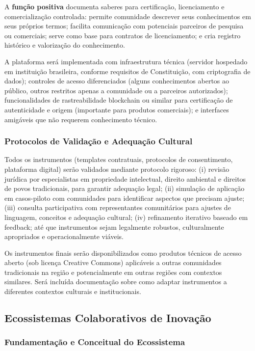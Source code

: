 A \textbf{função positiva} documenta saberes para certificação, licenciamento e comercialização controlada: permite comunidade descrever seus conhecimentos em seus próprios termos; facilita comunicação com potenciais parceiros de pesquisa ou comerciais; serve como base para contratos de licenciamento; e cria registro histórico e valorização do conhecimento.

A plataforma será implementada com infraestrutura técnica (servidor hospedado em instituição brasileira, conforme requisitos de Constituição, com criptografia de dados); controles de acesso diferenciados (alguns conhecimentos abertos ao público, outros restritos apenas a comunidade ou a parceiros autorizados); funcionalidades de rastreabilidade blockchain ou similar para certificação de autenticidade e origem (importante para produtos comerciais); e interfaces amigáveis que não requerem conhecimento técnico.

\subsubsection{Protocolos de Validação e Adequação Cultural}

Todos os instrumentos (templates contratuais, protocolos de consentimento, plataforma digital) serão validados mediante protocolo rigoroso: (i) revisão jurídica por especialistas em propriedade intelectual, direito ambiental e direitos de povos tradicionais, para garantir adequação legal; (ii) simulação de aplicação em casos-piloto com comunidades para identificar aspectos que precisam ajuste; (iii) consulta participativa com representantes comunitários para ajustes de linguagem, conceitos e adequação cultural; (iv) refinamento iterativo baseado em feedback; até que instrumentos sejam legalmente robustos, culturalmente apropriados e operacionalmente viáveis.

Os instrumentos finais serão disponibilizados como produtos técnicos de acesso aberto (sob licença Creative Commons) aplicáveis a outras comunidades tradicionais na região e potencialmente em outras regiões com contextos similares. Será incluída documentação sobre como adaptar instrumentos a diferentes contextos culturais e institucionais.

\subsection{Ecossistemas Colaborativos de Inovação}

\subsubsection{Fundamentação e Conceitual do Ecossistema}

